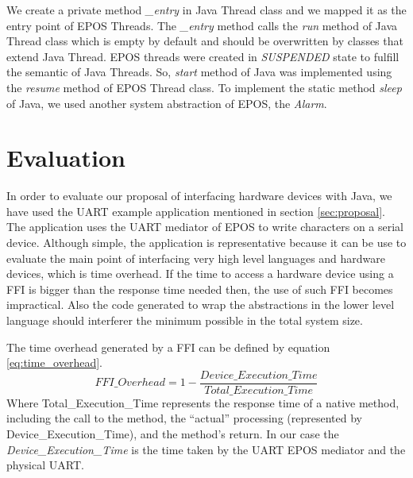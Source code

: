 \documentclass[12pt]{article} %
\begin{document}
	We create a private method \emph{\_entry} in Java Thread class and we mapped
it as the entry point of EPOS Threads. The \emph{\_entry} method calls the 
\emph{run} method of Java Thread class which is empty by default and should be
overwritten by classes that extend Java Thread. EPOS threads were created in
\emph{SUSPENDED} state to fulfill the semantic of Java Threads. So, \emph{start}
method of Java was implemented using the \emph{resume} method of EPOS Thread
class. To implement the static method \emph{sleep} of Java, we used another
system abstraction of EPOS, the \emph{Alarm}.


\section{Evaluation}
\label{sec:case_study}
In order to evaluate our proposal of interfacing hardware devices with Java, we have used the UART example application mentioned in section \ref{sec:proposal}. The application uses the UART mediator of EPOS to write characters on a serial device. %
Although simple, the application is representative because it can be use to evaluate the main point of interfacing very high level languages and hardware devices, which is time overhead. If the time to access a hardware device using a FFI is bigger than the response time needed then, the use of such FFI becomes impractical. Also the code generated to wrap the abstractions in the lower level language should interferer the minimum possible in the total system size.

The time overhead generated by a FFI can be defined by equation \ref{eq:time_overhead}.
\begin{equation}
\label{eq:time_overhead}
FFI\_Overhead = 1 - \frac{Device\_Execution\_Time} {Total\_Execution\_Time}
\end{equation}
Where Total\_Execution\_Time represents the response time of a native method, including the call to the method, the ``actual'' processing (represented by Device\_Execution\_Time), and the method's return. In our case the \emph{Device\_Execution\_Time} is the time taken by the UART EPOS mediator and the physical UART. 
\end{document}
